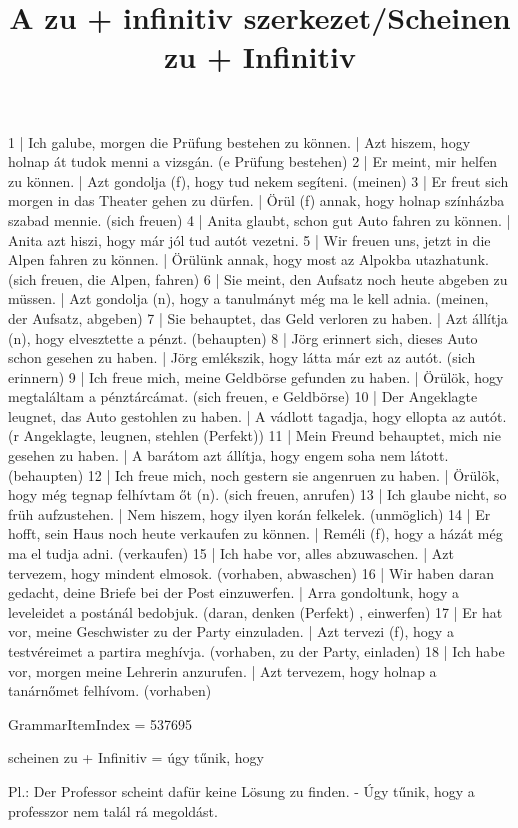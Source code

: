 \begin{exmp}
1 | Ich galube, morgen die Prüfung bestehen zu können. | Azt hiszem, hogy holnap át tudok menni a vizsgán. (e Prüfung bestehen)
2 | Er meint, mir helfen zu können. | Azt gondolja (f), hogy tud nekem segíteni. (meinen)
3 | Er freut sich morgen in das Theater gehen zu dürfen. | Örül (f) annak, hogy holnap színházba szabad mennie. (sich freuen)
4 | Anita glaubt, schon gut Auto fahren zu können. | Anita azt hiszi, hogy már jól tud autót vezetni.
5 | Wir freuen uns, jetzt in die Alpen fahren zu können. | Örülünk annak, hogy most az Alpokba utazhatunk. (sich freuen, die Alpen, fahren)
6 | Sie meint, den Aufsatz noch heute abgeben zu müssen. | Azt gondolja (n), hogy a tanulmányt még ma le kell adnia. (meinen, der Aufsatz, abgeben)
7 | Sie behauptet, das Geld verloren zu haben. | Azt állítja (n), hogy elvesztette a pénzt. (behaupten)
8 | Jörg erinnert sich, dieses Auto schon gesehen zu haben. | Jörg emlékszik, hogy látta már ezt az autót. (sich erinnern)
9 | Ich freue mich, meine Geldbörse gefunden zu haben. | Örülök, hogy megtaláltam a pénztárcámat. (sich freuen, e Geldbörse)
10 | Der Angeklagte leugnet, das Auto gestohlen zu haben. | A vádlott tagadja, hogy ellopta az autót. (r Angeklagte, leugnen, stehlen (Perfekt))
11 | Mein Freund behauptet, mich nie gesehen zu haben. | A barátom azt állítja, hogy engem soha nem látott. (behaupten)
12 | Ich freue mich, noch gestern sie angenruen zu haben. | Örülök, hogy még tegnap felhívtam őt (n). (sich freuen, anrufen)
13 | Ich glaube nicht, so früh aufzustehen. | Nem hiszem, hogy ilyen korán felkelek. (unmöglich)
14 | Er hofft, sein Haus noch heute verkaufen zu können. | Reméli (f), hogy a házát még ma el tudja adni. (verkaufen)
15 | Ich habe vor, alles abzuwaschen. | Azt tervezem, hogy mindent elmosok. (vorhaben, abwaschen)
16 | Wir haben daran gedacht, deine Briefe bei der Post einzuwerfen. | Arra gondoltunk, hogy a leveleidet a postánál bedobjuk. (daran, denken (Perfekt) , einwerfen)
17 | Er hat vor, meine Geschwister zu der Party einzuladen. | Azt tervezi (f), hogy a testvéreimet a partira meghívja. (vorhaben, zu der Party, einladen)
18 | Ich habe vor, morgen meine Lehrerin anzurufen. | Azt tervezem, hogy holnap a tanárnőmet felhívom. (vorhaben)
\end{exmp}

\title{A zu + infinitiv szerkezet/Scheinen zu + Infinitiv}

GrammarItemIndex = 537695

\begin{desc}
scheinen zu + Infinitiv = úgy tűnik, hogy

Pl.: Der Professor scheint dafür keine Lösung zu finden. - Úgy tűnik, hogy a professzor nem talál rá megoldást.
\end{desc}

